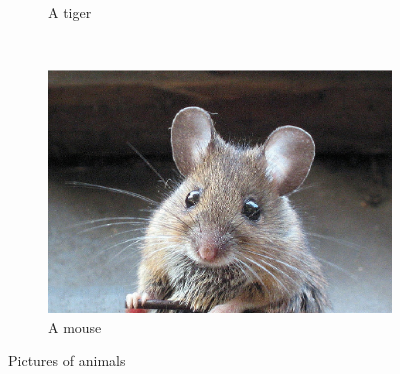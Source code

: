 \documentclass[12pt]{article}
\begin{document}
\begin{figure}
\begin{subfigure}[b]{0.3\textwidth}
        \caption{A tiger}
        \label{fig:tiger}
    \end{subfigure}
    ~ %
    \begin{subfigure}[b]{0.3\textwidth}
        \includegraphics[width=\textwidth]{mouse.eps}
        \caption{A mouse}
        \label{fig:mouse}
    \end{subfigure}
    \caption{Pictures of animals}\label{fig:animals}
\end{figure}
\end{document}
